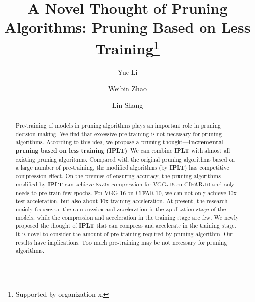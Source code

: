 \documentclass[runningheads]{llncs}
\begin{document}
%
\title{A Novel Thought of Pruning Algorithms: Pruning Based on Less Training\thanks{Supported by organization x.}}
%
%
\author{Yue Li\inst{} \and
Weibin Zhao\inst{} \and
Lin Shang\inst{(}\Envelope\inst{)}}
%
%
%
\maketitle              %
%
\begin{abstract}
Pre-training of models in pruning algorithms plays an important role in pruning decision-making. We find that excessive pre-training is not necessary for pruning algorithms. According to this idea, we propose a pruning thought---\textbf{Incremental pruning based on less training (IPLT)}. We can combine \textbf{IPLT} with almost all existing pruning algorithms. Compared with the original pruning algorithms based on a large number of pre-training, the modified algorithms (by \textbf{IPLT}) has competitive compression effect. On the premise of ensuring accuracy, the pruning algorithms modified by \textbf{IPLT} can achieve 8x-9x compression for VGG-16 on CIFAR-10 and only needs to pre-train few epochs. For VGG-16 on CIFAR-10, we can not only achieve 10x test acceleration, but also about 10x training acceleration. At present, the research mainly focuses on the compression and acceleration in the application stage of the models, while the compression and acceleration in the training stage are few. We newly proposed the thought of \textbf{IPLT} that can compress and accelerate in the training stage. It is novel to consider the amount of pre-training required by pruning algorithm. Our results have implications: Too much pre-training may be not necessary for pruning algorithms.

\end{abstract}
%
%
%
\end{document}
